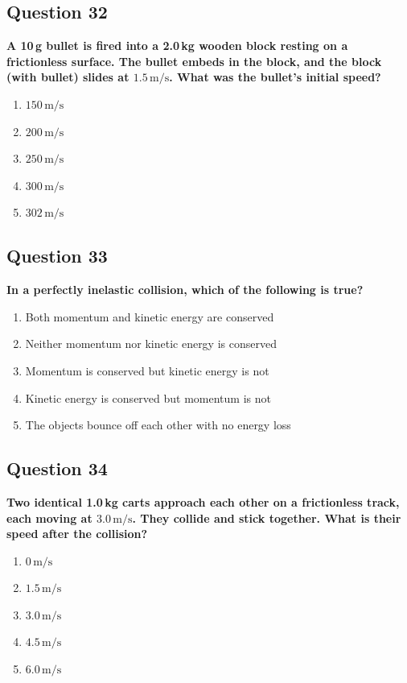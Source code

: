 \documentclass[12pt,letterpaper]{article}
\begin{document}
\subsection{Question 32}

\begin{questionbox}
\textbf{A 10\,g bullet is fired into a 2.0\,kg wooden block resting on a frictionless surface. The bullet embeds in the block, and the block (with bullet) slides at $1.5\,\text{m/s}$. What was the bullet's initial speed?}

\begin{enumerate}[label=\alph*)]
    \item $150\,\text{m/s}$
    \item $200\,\text{m/s}$
    \item $250\,\text{m/s}$
    \item $300\,\text{m/s}$
    \item $302\,\text{m/s}$
\end{enumerate}
\end{questionbox}

\subsection{Question 33}

\begin{questionbox}
\textbf{In a perfectly inelastic collision, which of the following is true?}

\begin{enumerate}[label=\alph*)]
    \item Both momentum and kinetic energy are conserved
    \item Neither momentum nor kinetic energy is conserved
    \item Momentum is conserved but kinetic energy is not
    \item Kinetic energy is conserved but momentum is not
    \item The objects bounce off each other with no energy loss
\end{enumerate}
\end{questionbox}

\subsection{Question 34}

\begin{questionbox}
\textbf{Two identical 1.0\,kg carts approach each other on a frictionless track, each moving at $3.0\,\text{m/s}$. They collide and stick together. What is their speed after the collision?}

\begin{enumerate}[label=\alph*)]
    \item $0\,\text{m/s}$
    \item $1
.5\,\text{m/s}$
    \item $3.0\,\text{m/s}$
    \item $4.5\,\text{m/s}$
    \item $6.0\,\text{m/s}$
\end{enumerate}
\end{questionbox}
\end{document}
